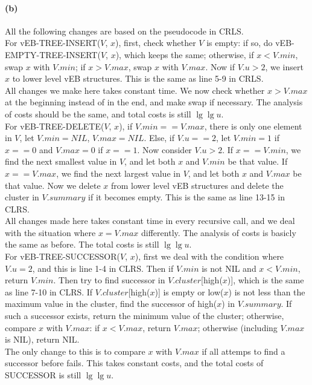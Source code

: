 \documentclass{6046}
\begin{document}
\paragraph{(b)}
All the following changes are based on the 
pseudocode in CRLS. 
\\

For vEB-TREE-INSERT($V$, $x$), 
first, check whether $V$ is empty: 
if so, do vEB-EMPTY-TREE-INSERT($V$, $x$), 
which keeps the same; 
otherwise, 
if $x < V.min$, swap $x$ with $V.min$; 
if $x > V.max$, swap $x$ with $V.max$. 
Now if $V.u > 2$,  we insert $x$ to lower level vEB structures. 
This is the same as line 5-9 in CRLS.  
\\

All changes we make here takes constant time. 
We now check whether $x > V.max$ at the beginning instead of in the end, 
and make swap if necessary. 
The analysis of costs should be the same, 
and total costs is still $\lg{\lg{u}}$.
\\

For vEB-TREE-DELETE($V$, $x$), 
if $V.min == V.max$, there is only one element in $V$, 
let $V.min = NIL$, $V.max = NIL$. 
Else, if $V.u == 2$, 
let $V.min = 1$ if $x == 0$ and 
$V.max = 0$ if $x == 1$. 
Now consider $V.u > 2$. 
If $x == V.min$, we find 
the next smallest value in $V$, 
and let both $x$ and $V.min$ be that value. 
If $x == V.max$, we find 
the next largest value in $V$, 
and let both $x$ and $V.max$ be that value. 
Now we delete $x$ from lower level vEB structures 
and delete the cluster in $V.summary$ if it becomes empty.  
This is the same as line 13-15 in CLRS. 
\\

All changes made here takes constant time in every recursive call, 
and we deal with the situation where 
$x=V.max$ differently. 
The analysis of costs is basicly the same as 
before. 
The total costs is still $\lg{\lg{u}}$. 
\\

For vEB-TREE-SUCCESSOR($V$, $x$), 
first we deal with the condition where 
$V.u=2$, and this is line 1-4 in CLRS.
Then if $V.min$ is not NIL and $x < V.min$, 
return $V.min$.   
Then try to find successor in $V.cluster$[high($x$)], 
which is the same as line 7-10 in CLRS. 
If $V.cluster$[high($x$)] is empty or low($x$) 
is not less than the maximum value in the cluster, 
find the successor 
of high($x$) in $V.summary$. 
If such a successor exists, return the minimum value of the cluster; 
otherwise, compare $x$ with $V.max$: 
if $x < V.max$, return $V.max$; 
otherwise (including $V.max$ is NIL), return NIL. 
\\

The only change to this is to 
compare $x$ with $V.max$ if all attemps to 
find a successor before fails. 
This takes constant costs, and the total costs 
of SUCCESSOR is still $\lg{\lg{u}}$. 
\end{document}
